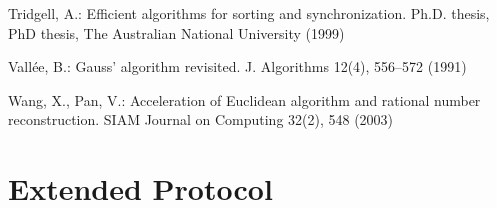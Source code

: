 \documentclass[11pt]{llncs}
\begin{document}
\begin{thebibliography}{10}
Tridgell, A.: Efficient algorithms for sorting and synchronization. Ph.D.
  thesis, PhD thesis, The Australian National University (1999)

Vall{\'e}e, B.: Gauss' algorithm revisited. J. Algorithms  12(4),  556--572
  (1991)

Wang, X., Pan, V.: Acceleration of {E}uclidean algorithm and rational number
  reconstruction. SIAM Journal on Computing  32(2),  548 (2003)

\end{thebibliography}

\appendix

\section{Extended Protocol}
\label{sec:extended}
\end{document}

